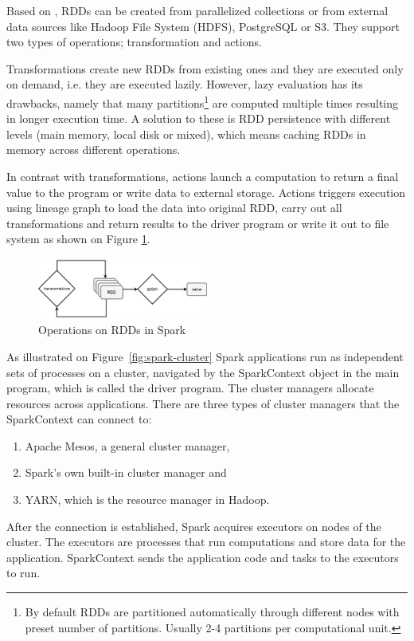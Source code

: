 Based on \cite{spark:rdds}, RDDs can be created from parallelized collections or from external data sources like Hadoop File System (HDFS), PostgreSQL or S3. They support two types of operations; transformation and actions.

Transformations create new RDDs from existing ones and they are executed only on demand, i.e. they are executed lazily. However, lazy evaluation has its drawbacks, namely that many partitions\footnote{By default RDDs are partitioned automatically  through different nodes with preset number of partitions. Usually 2-4 partitions per computational unit.} are computed multiple times resulting in longer execution time. A solution to these is RDD persistence with different levels (main memory, local disk or mixed), which means caching RDDs in memory across different operations. 
 
In contrast with transformations, actions launch a computation to return a final value to the program or write data to external storage. Actions triggers execution using lineage graph to load the data into original RDD, carry out all transformations and return  results to the driver program or write it out to file system as shown on Figure \ref{fig:spark-ops}.

\begin{figure}[h]
    \centering
    \includegraphics[width=0.5\textwidth]{images/operations_spark.png}
    \caption{Operations on RDDs in Spark}
    \label{fig:spark-ops}
\end{figure}

As illustrated on Figure~\ref{fig:spark-cluster} Spark applications run as independent sets of processes on a cluster, navigated by the SparkContext object in the main program, which is called the driver program. The cluster managers allocate resources across applications. There are three types of cluster managers that the SparkContext can connect to:
\begin{enumerate}
\item Apache Mesos, a general cluster manager, 
\item Spark's own built-in cluster manager and
\item YARN, which is the resource manager in Hadoop.
\end{enumerate}
After the connection is established, Spark acquires executors on nodes of the cluster. The executors are processes that run computations and store data for the application. SparkContext sends the application code and tasks to the executors to run.
\cite{spark-cluster}

